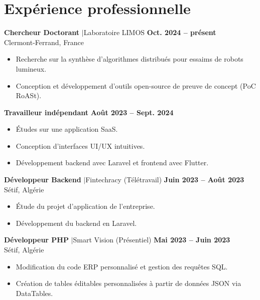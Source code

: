 \documentclass[a4paper,10pt]{article}
\begin{document}
\pagebreak

\section{Expérience professionnelle}

\textbf{Chercheur Doctorant} \enspace$|$\enspace \textcolor{textgray}{Laboratoire LIMOS} \hfill \textbf{Oct. 2024 -- présent}\\
\textcolor{textgray}{Clermont-Ferrand, France}
\begin{itemize}
    \item Recherche sur la synthèse d'algorithmes distribués pour essaims de robots lumineux.
    \item Conception et développement d'outils open-source de preuve de concept (PoC RoASt).
\end{itemize}

\vspace{2pt}

\textbf{Travailleur indépendant} \hfill \textbf{Août 2023 -- Sept. 2024}
\begin{itemize}
    \item Études sur une application SaaS.
    \item Conception d’interfaces UI/UX intuitives.
    \item Développement backend avec Laravel et frontend avec Flutter.
\end{itemize}

\vspace{2pt}

\textbf{Développeur Backend} \enspace$|$\enspace \textcolor{textgray}{Fintechracy (Télétravail)} \hfill \textbf{Juin 2023 -- Août 2023}\\
\textcolor{textgray}{Sétif, Algérie}
\begin{itemize}
    \item Étude du projet d'application de l'entreprise.
    \item Développement du backend en Laravel.
\end{itemize}

\vspace{2pt}

\textbf{Développeur PHP} \enspace$|$\enspace \textcolor{textgray}{Smart Vision (Présentiel)} \hfill \textbf{Mai 2023 -- Juin 2023}\\
\textcolor{textgray}{Sétif, Algérie}
\begin{itemize}
    \item Modification du code ERP personnalisé et gestion des requêtes SQL.
    \item Création de tables éditables personnalisées à partir de données JSON via DataTables.
\end{itemize}
\end{document}
